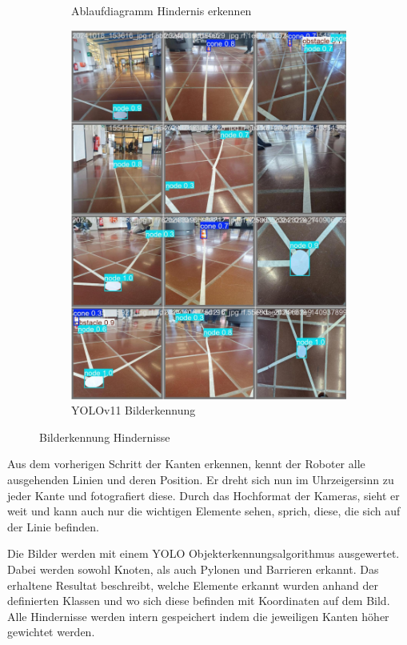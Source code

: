 \begin{figure}[H]
\begin{subfigure}{0.45\textwidth}
\caption{Ablaufdiagramm Hindernis erkennen}
\label{fig:ablaufdiagramm-hindernis-erkennen}
\end{subfigure}
\begin{subfigure}{0.55\textwidth}
\includegraphics[width=\textwidth]{assets/informatik-prototyp/yolo/recognized-images.jpeg}
\caption{YOLOv11 Bilderkennung}
\label{fig:img-recognition-yolo-concept}
\end{subfigure}
\caption{Bilderkennung Hindernisse}
\label{fig:image-detection-obstacles}
\end{figure}

Aus dem vorherigen Schritt der Kanten erkennen, kennt der Roboter alle ausgehenden Linien und deren Position. Er dreht sich nun im Uhrzeigersinn zu jeder Kante und fotografiert diese. Durch das Hochformat der Kameras, sieht er weit und kann auch nur die wichtigen Elemente sehen, sprich, diese, die sich auf der Linie befinden.

Die Bilder werden mit einem YOLO Objekterkennungsalgorithmus ausgewertet. Dabei werden sowohl Knoten, als auch Pylonen und Barrieren erkannt. Das erhaltene Resultat beschreibt, welche Elemente erkannt wurden anhand der definierten Klassen und wo sich diese befinden mit Koordinaten auf dem Bild.
Alle Hindernisse werden intern gespeichert indem die jeweiligen Kanten höher gewichtet werden.


